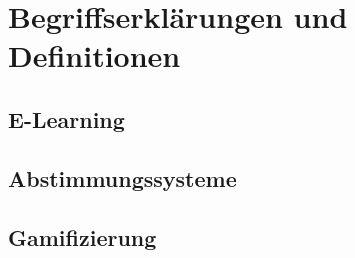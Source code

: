 \chapter{Begriffserklärungen und Definitionen}
\label{cha:Begriffserklärungen und Definitionen}

\section{E-Learning}

\section{Abstimmungssysteme}

\section{Gamifizierung}


